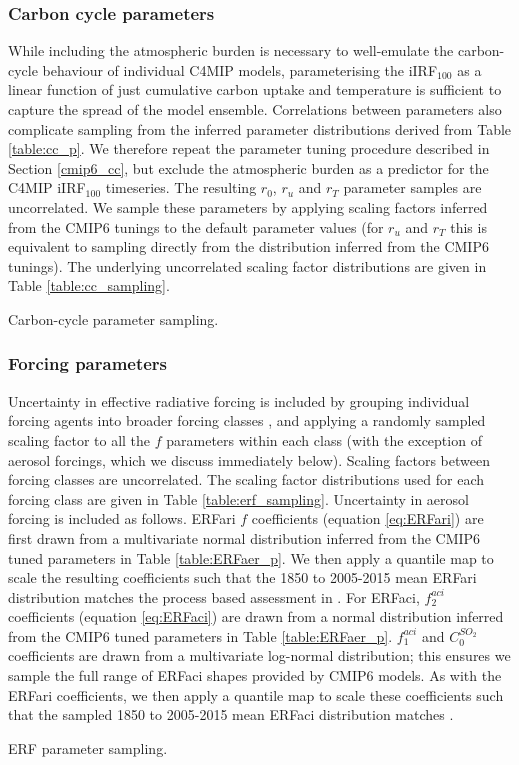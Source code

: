 \documentclass[gmd, manuscript]{copernicus}
\begin{document}
\subsubsection{Carbon cycle parameters} \label{cc_sampling}
While including the atmospheric burden is necessary to well-emulate the carbon-cycle behaviour of individual C4MIP models, parameterising the iIRF$_{100}$ as a linear function of just cumulative carbon uptake and temperature is sufficient to capture the spread of the model ensemble. Correlations between parameters also complicate sampling from the inferred parameter distributions derived from Table \ref{table:cc_p}. We therefore repeat the parameter tuning procedure described in Section \ref{cmip6_cc}, but exclude the atmospheric burden as a predictor for the C4MIP iIRF$_{100}$ timeseries. The resulting $r_0$, $r_u$ and $r_T$ parameter samples are uncorrelated. We sample these parameters by applying scaling factors inferred from the CMIP6 tunings to the default parameter values (for $r_u$ and $r_T$ this is equivalent to sampling directly from the distribution inferred from the CMIP6 tunings). The underlying uncorrelated scaling factor distributions are given in Table \ref{table:cc_sampling}.
\begin{table}[h]
    \caption{Carbon-cycle parameter sampling.}
    \label{table:cc_sampling}
    
\end{table}
\clearpage
\subsubsection{Forcing parameters} \label{forcing_sampling}
Uncertainty in effective radiative forcing is included by grouping individual forcing agents into broader forcing classes \citep{IPCC2013f}, and applying a randomly sampled scaling factor to all the $f$ parameters within each class (with the exception of aerosol forcings, which we discuss immediately below). Scaling factors between forcing classes are uncorrelated. The scaling factor distributions used for each forcing class are given in Table \ref{table:erf_sampling}. Uncertainty in aerosol forcing is included as follows. ERFari $f$ coefficients (equation \ref{eq:ERFari}) are first drawn from a multivariate normal distribution inferred from the CMIP6 tuned parameters in Table \ref{table:ERFaer_p}. We then apply a quantile map to scale the resulting coefficients such that the 1850 to 2005-2015 mean ERFari distribution matches the process based assessment in \cite{Bellouin}. For ERFaci, $f_2^{aci}$ coefficients (equation \ref{eq:ERFaci}) are drawn from a normal distribution inferred from the CMIP6 tuned parameters in Table \ref{table:ERFaer_p}. $f_1^{aci}$ and $C_0^{SO_2}$ coefficients are drawn from a multivariate log-normal distribution; this ensures we sample the full range of ERFaci shapes provided by CMIP6 models. As with the ERFari coefficients, we then apply a quantile map to scale these coefficients such that the sampled 1850 to 2005-2015 mean ERFaci distribution matches \citet{Bellouin}.
\begin{table}[h]
    \caption{ERF parameter sampling.}
    \label{table:erf_sampling}
    
\end{table}
\clearpage
\end{document}
